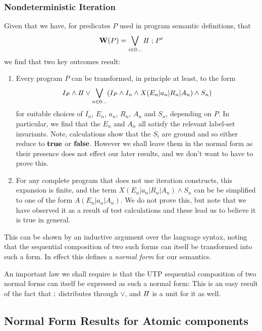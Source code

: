 \subsubsection{Nondeterministic Iteration}

Given that we have,
for predicates $P$ used in program semantic definitions,
that
\[
  \mathbf{W}(P) = \bigvee_{i \in 0\dots} I\!I \mathrel{;} P^i
\]
we find that two key outcomes result:
\begin{enumerate}
  \item
    Every program $P$ can be transformed,
    in principle at least,
    to the form
    \[
      I_P \land I\!I
      \lor
      \bigvee_{n \in 0\dots}  (I_P \land I_n \land X(E_n|a_n|R_n|A_n) \land S_n)
    \]
    for suitable choices of $I_n$, $E_n$, $a_n$, $R_n$, $A_n$ and $S_n$,
    depending on $P$.
    In particular, we find that the $E_n$ and $A_n$ all satisfy the relevant
    label-set invariants.
    Note, calculations show that
    the $S_i$ are ground and so either reduce to $\mathbf{true}$ or $\mathbf{false}$.
    However we shall leave them in the normal form as their presence
    does not effect our later results,
    and we don't want to have to prove this.
  \item
    For any complete program that does not use iteration constructs,
    this expansion is finite, and the term $X(E_n|a_n|R_n|A_n) \land S_n$
    can be be simplified to one of the form $A(E_n|a_n|A_n)$.
    We do not prove this, but note that we have observed it as a result
    of test calculations and these lead us to believe it is true in general.
\end{enumerate}
This can be shown by an inductive argument over the language syntax,
noting that the sequential composition of two such forms
can itself be transformed into such a form.
In effect this defines a \emph{normal form} for our semantics.


An important law we shall require is that the UTP sequential
composition of two normal forms can itself be expressed
as such a normal form:
This is an easy result of the fact that $\mathrel{;}$ distributes through $\lor$,
and $I\!I$ is a unit for it as well.


\subsection{Normal Form Results for Atomic components}

